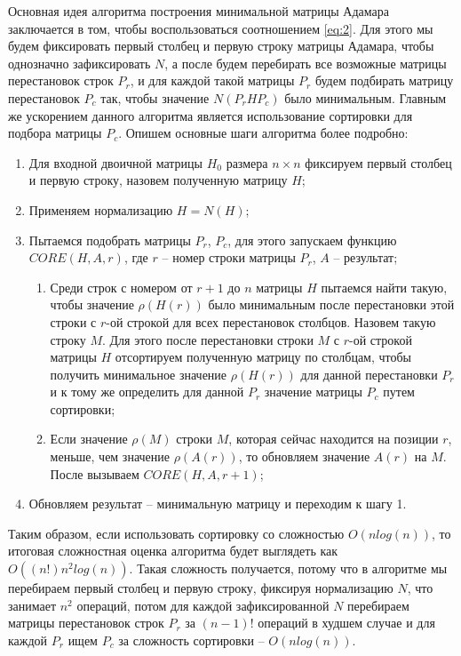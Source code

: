 Основная идея алгоритма построения минимальной матрицы Адамара заключается в том, чтобы воспользоваться соотношением \ref{eq:2}. Для этого мы будем фиксировать первый столбец и первую строку матрицы Адамара, чтобы однозначно зафиксировать $N$, а после будем перебирать все возможные матрицы перестановок строк $P_r$, и для каждой такой матрицы $P_r$ будем подбирать матрицу перестановок $P_c$ так, чтобы значение $N(P_r H P_c)$ было минимальным. Главным же ускорением данного алгоритма является использование сортировки для подбора матрицы $P_c$. Опишем основные шаги алгоритма более подробно:
\begin{enumerate}
    \item Для входной двоичной матрицы $H_0$ размера $n \times n$ фиксируем первый столбец и первую строку, назовем полученную матрицу $H$;
    \item Применяем нормализацию $H = N(H)$;
    \item Пытаемся подобрать матрицы $P_r$, $P_c$, для этого запускаем функцию $CORE(H, A, r)$, где $r$ -- номер строки матрицы $P_r$, $A$ -- результат;
    \begin{enumerate}
        \item Среди строк с номером от $r+1$ до $n$ матрицы $H$ пытаемся найти такую, чтобы значение $\rho(H(r))$ было минимальным после перестановки этой строки с $r$-ой строкой для всех перестановок столбцов. Назовем такую строку $M$. Для этого после перестановки строки $M$ с $r$-ой строкой матрицы $H$ отсортируем полученную матрицу по столбцам, чтобы получить минимальное значение $\rho(H(r))$ для данной перестановки $P_r$ и к тому же определить для данной $P_r$ значение матрицы $P_c$ путем сортировки;
        \item Если значение $\rho(M)$ строки $M$, которая сейчас находится на позиции $r$, меньше, чем значение $\rho(A(r))$, то обновляем значение $A(r)$ на $M$. После вызываем $CORE(H, A, r+1)$;
    \end{enumerate}
    \item Обновляем результат -- минимальную матрицу и переходим к шагу 1.
\end{enumerate}

Таким образом, если использовать сортировку со сложностью $O(nlog(n))$, то итоговая сложностная оценка алгоритма будет выглядеть как $O((n!)n^2log(n))$. Такая сложность получается, потому что в алгоритме мы перебираем первый столбец и первую строку, фиксируя нормализацию $N$, что занимает $n^2$ операций, потом для каждой зафиксированной $N$ перебираем матрицы перестановок строк $P_r$ за $(n-1)!$ операций в худшем случае и для каждой $P_r$ ищем $P_c$ за сложность сортировки -- $O(nlog(n))$.

